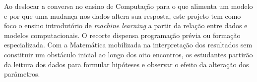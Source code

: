 Ao deslocar a conversa no ensino de Computação para o que alimenta um modelo e por que uma mudança nos dados altera sua resposta, este projeto tem como foco o ensino introdutório de \textit{machine learning} a partir da relação entre dados e modelos computacionais. O recorte dispensa programação prévia ou formação especializada. Com a Matemática mobilizada na interpretação dos resultados sem constituir um obstáculo inicial ao longo dos oito encontros, os estudantes partirão da leitura dos dados para formular hipóteses e observar o efeito da alteração dos parâmetros.



